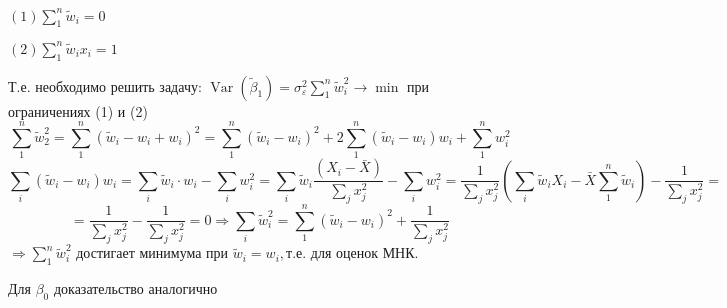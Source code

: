 \documentclass[12pt]{article}
\DeclareMathOperator{\var}{Var}
\renewcommand{\epsilon}{\varepsilon}
\newcommand{\msum}{\sum\limits_1^n}
\newcommand{\isum}{\sum\limits_i}
\newcommand{\jsum}{\sum\limits_j}
\begin{document}
$\displaystyle(1) \msum \tilde{w}_i = 0$

$\displaystyle(2) \msum \tilde{w}_i x_i = 1$

Т.е. необходимо решить задачу:
$\displaystyle \var(\tilde{\beta}_1) = \sigma_{\epsilon}^2 \msum \tilde{w}_i^2 \rightarrow \min$ при ограничениях (1) и (2)
$$\msum \tilde{w}_2^2 = \msum(\tilde{w}_i - w_i + w_i)^2 = \msum(\tilde{w}_i - w_i)^2 + 2\msum(\tilde{w}_i - w_i)w_i + \msum w_i^2$$
$$\isum (\tilde{w}_i - w_i) w_i = \isum \tilde{w}_i \cdot w_i - \isum w_i^2 = \isum \tilde{w}_i \frac{(X_i - \bar{X})}{\jsum x_j^2} - \isum w_i^2 = \frac{1}{\jsum x_j^2} \left(\isum \tilde{w}_i X_i - \bar{X} \msum \tilde{w}_i\right) - \frac{1}{\jsum x_j^2} =$$
$$= \frac{1}{\jsum x_j^2} - \frac{1}{\jsum x_j^2} = 0 \Rightarrow \isum \tilde{w}_i^2 = \msum(\tilde{w}_i - w_i)^2 + \frac{1}{\jsum x_j^2}$$
$\Rightarrow \msum \tilde{w}_i^2 \text{ достигает минимума при } \tilde{w}_i = w_i, \text{т.е. для оценок МНК.}$

Для $\beta_0$ доказательство аналогично
\end{document}
